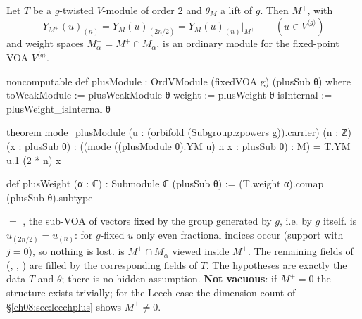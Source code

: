 \begin{theorem}\label{ch08:thm:plusModule}
Let $T$ be a $g$-twisted $V$-module of order $2$ and $\theta_M$ a lift of $g$.  Then $M^+$, with
\begin{equation*}
  Y_{M^+}(u)_{(n)}=Y_M(u)_{(2n/2)}=Y_M(u)_{(n)}\big|_{M^+}\qquad(u\in V^{\langle g\rangle})
\end{equation*}
and weight spaces $M^+_\alpha=M^+\cap M_\alpha$, is an ordinary module for the fixed-point VOA
$V^{\langle g\rangle}$.
\end{theorem}
\begin{leancode}
noncomputable def plusModule : OrdVModule (fixedVOA g) (plusSub θ) where
  toWeakModule := plusWeakModule θ
  weight := plusWeight θ
  isInternal := plusWeight_isInternal θ

theorem mode_plusModule (u : (orbifold (Subgroup.zpowers g)).carrier) (n : ℤ) (x : plusSub θ) :
    ((mode ((plusModule θ).YM u) n x : plusSub θ) : M) = T.YM u.1 (2 * n) x

def plusWeight (α : ℂ) : Submodule ℂ (plusSub θ) := (T.weight α).comap (plusSub θ).subtype
\end{leancode}
\begin{dictionary}
 $=$ , the sub-VOA of vectors fixed by
the group generated by $g$, i.e. by $g$ itself.   is $u_{(2n/2)}=u_{(n)}$:
for $g$-fixed $u$ only even fractional indices occur (support with $j=0$), so nothing is lost.
 is $M^+\cap M_\alpha$ viewed inside $M^+$.  The
remaining fields of  (, , ) are
filled by the corresponding fields of $T$.  The hypotheses are exactly the data $T$ and $\theta$;
there is no hidden assumption.  \textbf{Not vacuous}: if $M^+=0$ the structure exists trivially;
for the Leech case the dimension count of \S\ref{ch08:sec:leechplus} shows $M^+\ne0$.
\end{dictionary}

